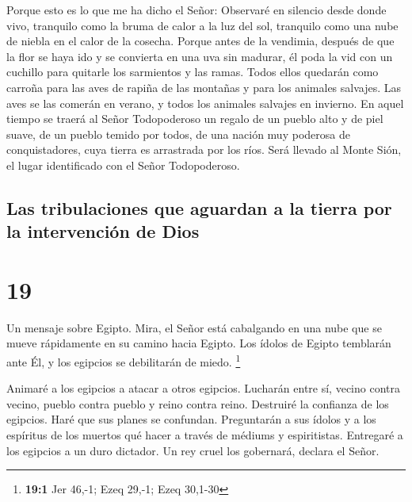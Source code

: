  Porque esto es lo que me ha dicho el Señor: Observaré en
silencio desde donde vivo, tranquilo como la bruma de calor a la luz del
sol, tranquilo como una nube de niebla en el calor de la cosecha.
 Porque antes de la vendimia, después de que la flor se
haya ido y se convierta en una uva sin madurar, él poda la vid con un
cuchillo para quitarle los sarmientos y las ramas.  Todos
ellos quedarán como carroña para las aves de rapiña de las montañas y
para los animales salvajes. Las aves se las comerán en verano, y todos
los animales salvajes en invierno.  En aquel tiempo se
traerá al Señor Todopoderoso un regalo de un pueblo alto y de piel
suave, de un pueblo temido por todos, de una nación muy poderosa de
conquistadores, cuya tierra es arrastrada por los ríos. Será llevado al
Monte Sión, el lugar identificado con el Señor Todopoderoso.

\hypertarget{las-tribulaciones-que-aguardan-a-la-tierra-por-la-intervenciuxf3n-de-dios}{%
\subsection{Las tribulaciones que aguardan a la tierra por la
intervención de
Dios}\label{las-tribulaciones-que-aguardan-a-la-tierra-por-la-intervenciuxf3n-de-dios}}

\hypertarget{section-18}{%
\section{19}\label{section-18}}

 Un mensaje sobre Egipto. Mira, el Señor está cabalgando
en una nube que se mueve rápidamente en su camino hacia Egipto. Los
ídolos de Egipto temblarán ante Él, y los egipcios se debilitarán de
miedo. \footnote{\textbf{19:1} Jer 46,-1; Ezeq 29,-1; Ezeq 30,1-30}

 Animaré a los egipcios a atacar a otros egipcios.
Lucharán entre sí, vecino contra vecino, pueblo contra pueblo y reino
contra reino.  Destruiré la confianza de los egipcios.
Haré que sus planes se confundan. Preguntarán a sus ídolos y a los
espíritus de los muertos qué hacer a través de médiums y espiritistas.
 Entregaré a los egipcios a un duro dictador. Un rey cruel
los gobernará, declara el Señor.

